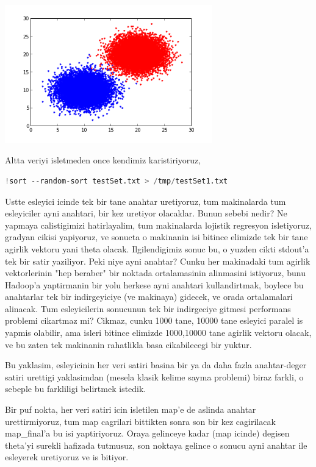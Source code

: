 \documentclass[12pt,fleqn]{article}\usepackage{../common}
\begin{document}
\includegraphics[height=6cm]{logreg1.png}

Altta veriyi isletmeden once kendimiz karistiriyoruz,

\begin{lstlisting}[language=Python]
!sort --random-sort testSet.txt > /tmp/testSet1.txt
\end{lstlisting}



Ustte esleyici icinde tek bir tane anahtar uretiyoruz, tum makinalarda tum
esleyiciler ayni anahtari, bir kez uretiyor olacaklar. Bunun sebebi nedir?
Ne yapmaya calistigimizi hatirlayalim, tum makinalarda lojistik regresyon
isletiyoruz, gradyan cikisi yapiyoruz, ve sonucta o makinanin isi bitince
elimizde tek bir tane agirlik vektoru yani theta olacak. Ilgilendigimiz
sonuc bu, o yuzden cikti stdout'a tek bir satir yaziliyor. Peki niye ayni
anahtar? Cunku her makinadaki tum agirlik vektorlerinin "hep beraber" bir
noktada ortalamasinin alinmasini istiyoruz, bunu Hadoop'a yaptirmanin bir
yolu herkese ayni anahtari kullandirtmak, boylece bu anahtarlar tek bir
indirgeyiciye (ve makinaya) gidecek, ve orada ortalamalari alinacak. Tum
esleyicilerin sonucunun tek bir indirgeciye gitmesi performans problemi
cikartmaz mi? Cikmaz, cunku 1000 tane, 10000 tane esleyici paralel is
yapmis olabilir, ama isleri bitince elimizde 1000,10000 tane agirlik
vektoru olacak, ve bu zaten tek makinanin rahatlikla basa cikabilecegi bir
yuktur.

Bu yaklasim, esleyicinin her veri satiri basina bir ya da daha fazla
anahtar-deger satiri urettigi yaklasimdan (mesela klasik kelime sayma
problemi) biraz farkli, o sebeple bu farkliligi belirtmek istedik.

Bir puf nokta, her veri satiri icin isletilen map'e de aslinda anahtar
urettirmiyoruz, tum map cagrilari bittikten sonra son bir kez cagirilacak
map\_final'a bu isi yaptiriyoruz. Oraya gelinceye kadar (map icinde) degisen
theta'yi surekli hafizada tutmusuz, son noktaya gelince o sonucu ayni
anahtar ile esleyerek uretiyoruz ve is bitiyor.
\end{document}
